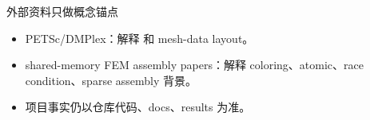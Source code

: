 \begin{frame}{外部资料只做概念锚点}
\begin{itemize}
  \item PETSc/DMPlex：解释  和 mesh-data layout。
  \item shared-memory FEM assembly papers：解释 coloring、atomic、race condition、sparse assembly 背景。
  \item 项目事实仍以仓库代码、docs、results 为准。
\end{itemize}
\end{frame}
